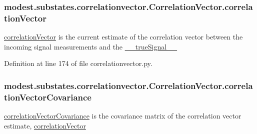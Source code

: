 \subsubsection[{\texorpdfstring{correlation\+Vector}{correlationVector}}]{\setlength{\rightskip}{0pt plus 5cm}modest.\+substates.\+correlationvector.\+Correlation\+Vector.\+correlation\+Vector}\hypertarget{classmodest_1_1substates_1_1correlationvector_1_1CorrelationVector_a81da583ee9077067b6aaa354fd8a8c49}{}\label{classmodest_1_1substates_1_1correlationvector_1_1CorrelationVector_a81da583ee9077067b6aaa354fd8a8c49}


\hyperlink{classmodest_1_1substates_1_1correlationvector_1_1CorrelationVector_a81da583ee9077067b6aaa354fd8a8c49}{correlation\+Vector} is the current estimate of the correlation vector between the incoming signal measurements and the \hyperlink{classmodest_1_1substates_1_1correlationvector_1_1CorrelationVector_af2f52cea1c695f36dd100f529c322e94}{\+\_\+\+\_\+true\+Signal\+\_\+\+\_\+} 



Definition at line 174 of file correlationvector.\+py.

\subsubsection[{\texorpdfstring{correlation\+Vector\+Covariance}{correlationVectorCovariance}}]{\setlength{\rightskip}{0pt plus 5cm}modest.\+substates.\+correlationvector.\+Correlation\+Vector.\+correlation\+Vector\+Covariance}\hypertarget{classmodest_1_1substates_1_1correlationvector_1_1CorrelationVector_a03bf36ec74d2fa70eeec14da348bec0c}{}\label{classmodest_1_1substates_1_1correlationvector_1_1CorrelationVector_a03bf36ec74d2fa70eeec14da348bec0c}


\hyperlink{classmodest_1_1substates_1_1correlationvector_1_1CorrelationVector_a03bf36ec74d2fa70eeec14da348bec0c}{correlation\+Vector\+Covariance} is the covariance matrix of the correlation vector estimate, \hyperlink{classmodest_1_1substates_1_1correlationvector_1_1CorrelationVector_a81da583ee9077067b6aaa354fd8a8c49}{correlation\+Vector} 



